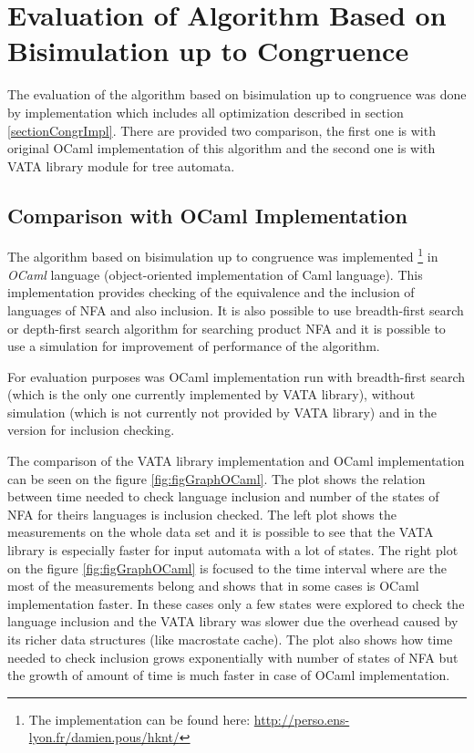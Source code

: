\section{Evaluation of Algorithm Based on Bisimulation up to Congruence}
The evaluation of the algorithm based on bisimulation up to congruence was done by implementation which includes all optimization described in section 
\ref{sectionCongrImpl}. There are provided two comparison, the first one is with original OCaml implementation of this algorithm and the second one is with
VATA library module for tree automata.

\subsection{Comparison with OCaml Implementation}
The algorithm based on bisimulation up to congruence was implemented 
\footnote{The implementation can be found here: \url{http://perso.ens-lyon.fr/damien.pous/hknt/}} 
in \emph{OCaml} language (object-oriented implementation of Caml language). 
This implementation provides checking of the equivalence
and the inclusion of languages of NFA and also inclusion. It is also possible to use breadth-first search or depth-first search algorithm for searching 
product NFA and it is possible to use a simulation for improvement of performance of the algorithm.

For evaluation purposes was OCaml implementation run with breadth-first search (which is the only one currently implemented by VATA library), without
simulation (which is not currently not provided by VATA library) and in the version for inclusion checking.

The comparison of the VATA library implementation and OCaml implementation can be seen on the figure \ref{fig:figGraphOCaml}. 
The plot shows the relation between time needed to check language inclusion and number of the states of NFA for theirs languages is inclusion checked.
The left plot shows the measurements on the whole data set and it is possible to see that the VATA library is especially faster for input automata with a lot
of states. The right plot on the figure \ref{fig:figGraphOCaml} is focused to the time interval where are the most of the measurements belong and 
shows that in some cases is OCaml implementation faster. In these cases only a few states were explored to 
check the language inclusion and the VATA library was slower due the overhead caused by its richer data structures (like macrostate cache). The plot also shows
how time needed to check inclusion grows exponentially with number of states of NFA but 
the growth of amount of time is much faster in case of OCaml implementation.

